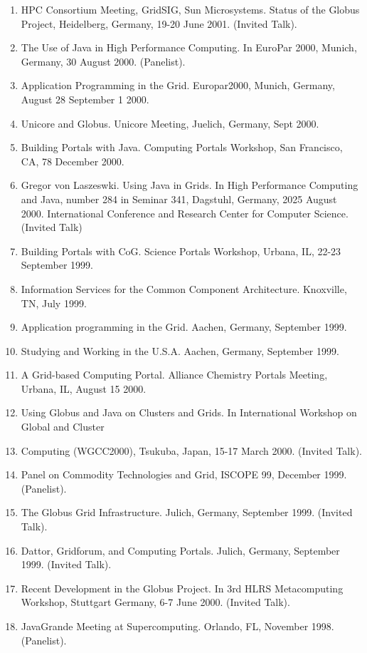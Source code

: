 \documentclass{article}
\begin{document}
\begin{enumerate}
\item  HPC Consortium Meeting, GridSIG, Sun Microsystems. Status of the Globus Project, Heidelberg, Germany, 19-20 June 2001. (Invited Talk). %
\item  The Use of Java in High Performance Computing. In EuroPar 2000, Munich, Germany, 30 August 2000. (Panelist). 
\item  Application Programming in the Grid. Europar2000, Munich, Germany, August 28 September 1 2000. 
\item  Unicore and Globus. Unicore Meeting, Juelich, Germany, Sept 2000. 
\item  Building Portals with Java. Computing Portals Workshop, San Francisco, CA, 78 December 2000. 
\item  Gregor von Laszeswki. Using Java in Grids. In High Performance Computing and Java, number 284 in Seminar 341, Dagstuhl, Germany, 2025 August 2000. International Conference and Research Center for Computer Science. (Invited Talk) 
\item  Building Portals with CoG. Science Portals Workshop, Urbana, IL, 22-23 September 1999. 
\item  Information Services for the Common Component Architecture. Knoxville, TN, July 1999. 
\item  Application programming in the Grid. Aachen, Germany, September 1999. 
\item  Studying and Working in the U.S.A. Aachen, Germany, September 1999. 
\item  A Grid-based Computing Portal. Alliance Chemistry Portals Meeting, Urbana, IL, August 15 2000. 
\item  Using Globus and Java on Clusters and Grids. In International Workshop on Global and Cluster 
\item  Computing (WGCC2000), Tsukuba, Japan, 15-17 March 2000. (Invited Talk). 
\item  Panel on Commodity Technologies and Grid, ISCOPE 99, December 1999. (Panelist). 
\item  The Globus Grid Infrastructure. Julich, Germany, September 1999. (Invited Talk). 
\item  Dattor, Gridforum, and Computing Portals. Julich, Germany, September 1999. (Invited Talk). 
\item  Recent Development in the Globus Project. In 3rd HLRS Metacomputing Workshop, Stuttgart Germany, 6-7 June 2000. (Invited Talk). 
\item  JavaGrande Meeting at Supercomputing. Orlando, FL, November 1998. (Panelist). 

\end{enumerate}
\end{document}
